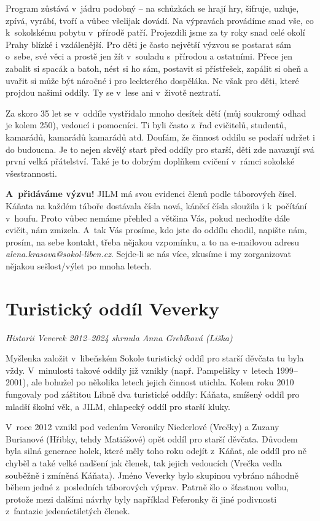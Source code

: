 \documentclass[a5paper, 11pt, twoside]{article}
\begin{document}
Program zůstává v~jádru podobný -- na schůzkách se hrají hry, šifruje,
uzluje, zpívá, vyrábí, tvoří a vůbec všelijak dovádí. Na výpravách
provádíme snad vše, co k~sokolskému pobytu v~přírodě patří. Projezdili
jsme za ty roky snad celé okolí Prahy blízké i vzdálenější. Pro děti je
často největší výzvou se postarat sám o~sebe, své věci a prostě jen žít
v~souladu s~přírodou a ostatními. Přece jen zabalit si spacák a batoh,
nést si ho sám, postavit si přístřešek, zapálit si oheň a uvařit si může
být náročné i pro leckterého dospěláka. Ne však pro děti, které projdou
našimi oddíly. Ty se v~lese ani v~životě neztratí.

Za skoro 35 let se v~oddíle vystřídalo mnoho desítek dětí (můj soukromý
odhad je kolem 250), vedoucí i pomocníci. Ti byli často z~řad cvičitelů,
studentů, kamarádů, kamarádů kamarádů atd. Doufám, že činnost oddílu se
podaří udržet i do budoucna. Je to nejen skvělý start před oddíly pro
starší, děti zde navazují svá první velká přátelství. Také je to dobrým
doplňkem cvičení v~rámci sokolské všestrannosti.

\textbf{A~přidáváme výzvu!} JILM má svou evidenci členů podle táborových
čísel. Káňata na každém táboře dostávala čísla nová, káněcí čísla
sloužila i k~počítání v~houfu. Proto vůbec nemáme přehled a většina Vás,
pokud nechodíte dále cvičit, nám zmizela. A~tak Vás prosíme, kdo jste do
oddílu chodil, napište nám, prosím, na sebe kontakt, třeba nějakou
vzpomínku, a to na e-mailovou adresu
\textit{alena.krasova@sokol-liben.cz}. Sejde-li se nás více, zkusíme
i my zorganizovat nějakou sešlost/výlet po mnoha letech.

\section{Turistický oddíl Veverky}

\textit{Historii Veverek 2012--2024 shrnula Anna Grebíková (Liška)}

Myšlenka založit v~libeňském Sokole turistický oddíl pro starší děvčata
tu byla vždy. V~minulosti takové oddíly již vznikly (např. Pampelišky
v~letech 1999--2001), ale bohužel po několika letech jejich činnost
utichla. Kolem roku 2010 fungovaly pod záštitou Libně dva turistické
oddíly: Káňata, smíšený oddíl pro mladší školní věk, a JILM, chlapecký
oddíl pro starší kluky.

V~roce 2012 vznikl pod vedením Veroniky Niederlové (Vrečky) a Zuzany
Burianové (Hřibky, tehdy Matiášové) opět oddíl pro starší děvčata.
Důvodem byla silná generace holek, které měly toho roku odejít z~Káňat,
ale oddíl pro ně chyběl a také velké nadšení jak členek, tak jejich
vedoucích (Vrečka vedla souběžně i zmíněná Káňata). Jméno Veverky bylo
skupinou vybráno náhodně během jedné z~posledních táborových výprav.
Patrně šlo o~šťastnou volbu, protože mezi dalšími návrhy byly například
Feferonky či jiné podivnosti z~fantazie jedenáctiletých členek.
\end{document}

